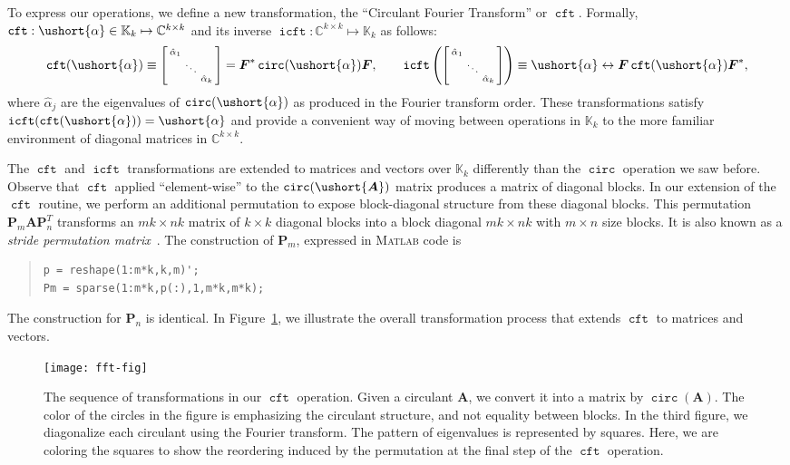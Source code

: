 \documentclass[1p,authoryear,letterpaper]{elsarticle}
\renewcommand{\cite}{\citep}
\DeclareMathOperator{\tcirc}{\texttt{circ}}
\providecommand{\eqdef}{\equiv}
\providecommand{\KK}{\mathbb{K}}
\providecommand{\CC}{\mathbb{C}}
\providecommand{\sbmat}[1]{\left[\begin{smallmatrix} #1 \end{smallmatrix}\right]}
\providecommand{\mat}{\boldsymbol}
\providecommand{\mA}{\ensuremath{\mat{A}}}
\providecommand{\mF}{\ensuremath{\mat{F}}}
\providecommand{\mP}{\ensuremath{\mat{P}}}
\DeclareMathOperator{\fft}{\texttt{cft}}
\DeclareMathOperator{\ifft}{\texttt{icft}}
\DeclareMathOperator{\icft}{\texttt{icft}}
\DeclareMathOperator{\cft}{\texttt{cft}}
\renewcommand{\circeq}{\leftrightarrow}
\newcommand{\cel}[1]{\ushort{#1}}
\newcommand{\celm}[1]{\cel{\mat{#1}}}
\newcommand{\calpha}{\ensuremath{\cel{\alpha}}}
\providecommand{\cmA}{\ensuremath{\celm{A}}}
\begin{document}
To express our operations, we define a new transformation,
the ``Circulant Fourier Transform'' or $\cft$.  Formally,
$\fft : \calpha \in \KK_k \mapsto \CC^{k \times k}$ and its
inverse $\ifft : \CC^{k \times k} \mapsto \KK_k$ as follows:
\[ \fft(\calpha) \eqdef \sbmat{ \hat{\alpha}_1 \\ & \ddots \\ & & \hat{\alpha}_k }
      = \mF^* \tcirc(\calpha) \mF,
   \qquad
   \ifft \left( \sbmat{ \hat{\alpha}_1 \\ & \ddots \\ & & \hat{\alpha}_k } \right) \eqdef
   \calpha \circeq \mF \fft(\calpha) \mF^*, \]
where $\hat{\alpha}_j$ are the eigenvalues of $\tcirc(\calpha)$ as produced
in the Fourier transform order.  These transformations satisfy
$\ifft(\fft(\calpha)) = \calpha$ and provide a convenient way of moving
between operations in $\KK_k$ to the more familiar environment
of diagonal matrices in $\CC^{k \times k}$.

The $\cft$ and $\icft$ transformations are extended to matrices and
vectors over $\KK_k$
differently than the $\tcirc$ operation we saw before.   Observe
that $\fft$ applied ``element-wise'' to the $\tcirc(\cmA)$ matrix produces a matrix
of diagonal blocks.  In our extension of the $\fft$ routine,
we perform an additional permutation to expose
block-diagonal structure from these diagonal blocks.  This permutation
 $\mP_m \mA \mP_n^T$
transforms an $mk \times nk$ matrix of $k \times k$
diagonal blocks into a block diagonal $mk \times nk$ with $m \times n$ size
blocks.
It is also known as a
\emph{stride permutation matrix}~\cite{Granata1992-tensor}.
The construction of $\mP_m$, expressed in \textsc{Matlab} code is
\begin{quote}
\begin{verbatim}
p = reshape(1:m*k,k,m)';
Pm = sparse(1:m*k,p(:),1,m*k,m*k);
\end{verbatim}
\end{quote}
The construction for $\mP_n$ is identical.
In Figure~\ref{fig:circ-fft}, we illustrate the overall
transformation process that extends $\fft$ to matrices
and vectors.
\begin{figure}
\centering
\texttt{[image: fft-fig]}

\caption{The sequence of transformations in our $\fft$ operation.
Given a circulant $\mA$, we convert it into a matrix by $\tcirc(\mA)$.
The color of the circles in the figure is emphasizing the circulant
structure, and not equality between blocks.  In the third
figure, we diagonalize each
circulant using the Fourier transform.  The pattern of
eigenvalues is represented by squares.  Here, we are coloring
the squares to show the reordering induced by the permutation
at the final step of the $\fft$ operation.}
\label{fig:circ-fft}
\end{figure}
\end{document}
